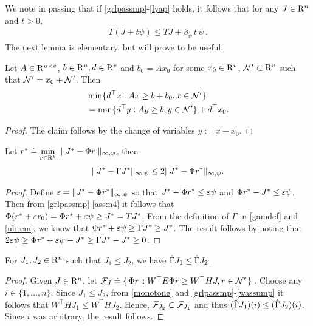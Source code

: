 We note in passing that if \cref{grlpassmp}-\eqref{lyap} holds, it follows that for any $J\in \mathrm{R}^n$ and $t>0$,
\begin{align}
\label{eq:psilin}
T(J+ t \psi ) \le TJ + \beta_{\psi}\,t\,  \psi\,. %
\end{align}
%
The next lemma is elementary, but will prove to be useful:
\begin{lemma}\label{lpsol}
Let $A\in \mathrm{R}^{u\times v}$, $b\in \mathrm{R}^u,d\in \mathrm{R}^v$ and $b_0=Ax_0$ for
some $x_0 \in \mathrm{R}^v$, $\mathcal{N}' \subset \mathrm{R}^v$ such that $\mathcal{N}' =x_0+ \mathcal{N}'$. Then
\begin{align}
&\min\{d^\top x:Ax\geq b+b_0, x\in \mathcal{N}'\} \nonumber\\
&=\min\{d^\top y:Ay \geq b, y \in \mathcal{N}' \}+d^\top x_0.
\end{align}
\end{lemma}
\begin{proof}
The claim follows by the change of variables $y := x-x_0$.
\end{proof}
\noindent 
\begin{lemma}\label{bestbndmn}
Let $r^*\doteq\underset{r\in \mathrm{R}^k}{\min}\parallel J^*-\Phi r\parallel_{\infty,\psi}$, then
\begin{align}
||J^*-\Gamma J^*||_{\infty,\psi}\leq 2||J^*-\Phi r^*||_{\infty,\psi}.
\end{align}
\end{lemma}
\begin{proof}
Define $\varepsilon = \|J^* - \Phi r^*\|_{\infty,\psi}$ so that
$ J^*-\Phi r^* \le \varepsilon \psi$ and $\Phi r^* - J^*\le \varepsilon \psi$. Then from \cref{grlpassmp}-\eqref{ass:n4} it follows that $\Phi( r^* + \varepsilon r_0 ) = \Phi r^* + \varepsilon \psi \ge J^* = T J^*$. From the definition of $\Gamma$ in \eqref{gamdef} and \cref{ubrem}, we know that $\Phi r^*+\varepsilon \psi \geq \Gamma J^*\geq J^*$. The result follows by noting that $2\varepsilon\psi\geq \Phi r^*+\varepsilon\psi -J^*\geq \Gamma J^*-J^*\geq 0$.
\end{proof}
\begin{lemma}\label{tgmonotone}
For $J_1, J_2\in \mathrm{R}^n$ such that $J_1\leq J_2$, we have $\hat{\Gamma} J_1\leq \hat{\Gamma} J_2$.
\end{lemma}
\begin{proof}
Given $J\in \mathrm{R}^n$, let $\mathcal{F}_J\doteq\{\,\Phi r\,: W^\top E \Phi r\geq W^\top HJ, r\in \mathcal{N}'\,\}\,$. Choose any $i\in \{1, \ldots, n\}$. Since $J_1\leq J_2$, from \cref{monotone} and \cref{grlpassmp}-\eqref{wassump} it follows that $W^\top H J_1\leq W^\top H J_2$. Hence, $\mathcal{F}_{J_2} \subset \mathcal{F}_{J_1}$ and thus $(\hat{\Gamma} J_1)(i) \le (\hat{\Gamma} J_2)(i)$.  Since $i$ was arbitrary, the result follows. 
\end{proof}
